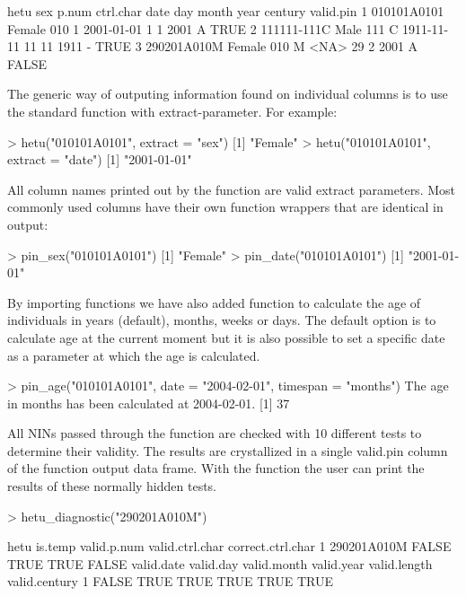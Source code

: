 \begin{example}
         hetu    sex p.num ctrl.char       date day month year century valid.pin
1 010101A0101 Female   010         1 2001-01-01   1     1 2001       A      TRUE
2 111111-111C   Male   111         C 1911-11-11  11    11 1911       -      TRUE
3 290201A010M Female   010         M       <NA>  29     2 2001       A     FALSE
\end{example}

The generic way of outputing information found on individual columns is to use the standard  function with extract-parameter. For example:

\begin{example}
  > hetu("010101A0101", extract = "sex")
  [1] "Female"
  > hetu("010101A0101", extract = "date")
  [1] "2001-01-01"
\end{example}

All column names printed out by the  function are valid extract parameters. Most commonly used columns have their own function wrappers that are identical in output:

\begin{example}
  > pin_sex("010101A0101")
  [1] "Female"
  > pin_date("010101A0101")
  [1] "2001-01-01"
\end{example}

By importing  \citep{lubridate} functions we have also added  function to calculate the age of individuals in years (default), months, weeks or days. The default option is to calculate age at the current moment but it is also possible to set a specific date as a parameter at which the age is calculated.

\begin{example}
  > pin_age("010101A0101", date = "2004-02-01", timespan = "months")
  The age in months has been calculated at 2004-02-01.
  [1] 37
\end{example}

All NINs passed through the  function are checked with 10 different tests to determine their validity. The results are crystallized in a single valid.pin column of the  function output data frame. With the  function the user can print the results of these normally hidden tests.

\begin{example}
  > hetu_diagnostic("290201A010M")
  
           hetu is.temp valid.p.num valid.ctrl.char correct.ctrl.char
  1 290201A010M   FALSE        TRUE            TRUE             FALSE
    valid.date valid.day valid.month valid.year valid.length valid.century
  1      FALSE      TRUE        TRUE       TRUE         TRUE          TRUE
\end{example}

